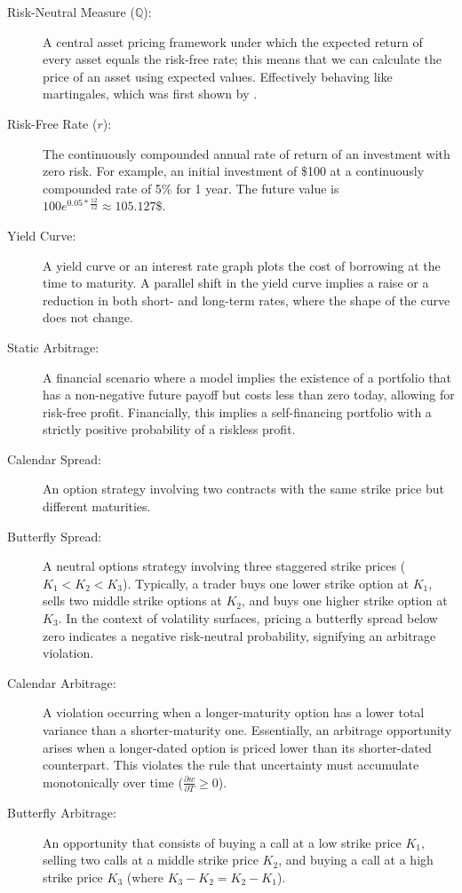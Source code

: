\documentclass[12pt,oneside]{report}
\theoremstyle{definition}
\theoremstyle{remark}
\begin{document}
\begin{description}
    \item[Risk-Neutral Measure ($\mathbb{Q}$):] A central asset pricing framework under which the expected return of every asset equals the risk-free rate; this means that we can calculate the price of an asset using expected values. Effectively behaving like martingales, which was first shown by \cite{harrison1979martingales}.
    \item[Risk-Free Rate ($r$):] The continuously compounded annual rate of return of an investment with zero risk. For example, an initial investment of \$100 at a continuously compounded rate of 5\% for 1 year. The future value is $100e^{0.05 * \frac{12}{12}} \approx 105.127\$$.
    \item[Yield Curve:] A yield curve or an interest rate graph plots the cost of borrowing at the time to maturity. A parallel shift in the yield curve implies a raise or a reduction in both short- and long-term rates, where the shape of the curve does not change.
    \item[Static Arbitrage:] A financial scenario where a model implies the existence of a portfolio that has a non-negative future payoff but costs less than zero today, allowing for risk-free profit. Financially, this implies a self-financing portfolio with a strictly positive probability of a riskless profit.
    \item[Calendar Spread:] An option strategy involving two contracts with the same strike price but different maturities.
     \item[Butterfly Spread:] A neutral options strategy involving three staggered strike prices ($K_1 < K_2 < K_3$). Typically, a trader buys one lower strike option at $K_1$, sells two middle strike options at $K_2$, and buys one higher strike option at $K_3$. In the context of volatility surfaces, pricing a butterfly spread below zero indicates a negative risk-neutral probability, signifying an arbitrage violation.
    \item[Calendar Arbitrage:] A violation occurring when a longer-maturity option has a lower total variance than a shorter-maturity one. Essentially, an arbitrage opportunity arises when a longer-dated option is priced lower than its shorter-dated counterpart. This violates the rule that uncertainty must accumulate monotonically over time ($\frac{\partial w}{\partial T} \ge 0$).
    \item[Butterfly Arbitrage:] An opportunity that consists of buying a call at a low strike price $K_1$, selling two calls at a middle strike price $K_2$, and buying a call at a high strike price $K_3$ (where $K_3 - K_2 = K_2 - K_1$).

\end{description}
\end{document}
